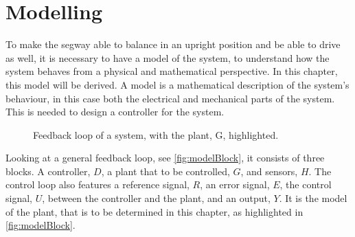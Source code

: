\chapter{Modelling} \label{ch:modelling}
To make the segway able to balance in an upright position and be able to drive as well, it is necessary to have a model of the system, to understand how the system behaves from a physical and mathematical perspective. In this chapter, this model will be derived. A model is a mathematical description of the system's behaviour, in this case both the electrical and mechanical parts of the system.
This is needed to design a controller for the system. %
\begin{figure}[H]
\centering
\scalebox{0.8}{

}
\caption{Feedback loop of a system, with the plant, G, highlighted.}
\label{fig:modelBlock}
\end{figure}
\vspace{-0.8 cm}
Looking at a general feedback loop, see \autoref{fig:modelBlock}, it consists of three blocks. A controller, $D$, a plant that to be controlled, $G$, and sensors, $H$. The control loop also features a reference signal, $R$, an error signal, $E$, the control signal, $U$, between the controller and the plant, and an output, $Y$. It is the model of the plant, that is to be determined in this chapter, as highlighted in \autoref{fig:modelBlock}.
